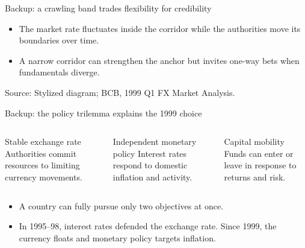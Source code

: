 \documentclass[10pt,aspectratio=169]{beamer}
\newcommand{\source}[1]{%
  \par\vfill{\tiny\color{MidGray}Source: #1}}
\begin{document}
\begin{frame}{Backup: a crawling band trades flexibility for credibility}
  \begin{center}
  \end{center}
  \begin{itemize}
    \item The market rate fluctuates inside the corridor while the authorities move its boundaries over time.
    \item A narrow corridor can strengthen the anchor but invites one-way bets when fundamentals diverge.
  \end{itemize}
  \source{Stylized diagram; BCB, 1999 Q1 FX Market Analysis.}
\end{frame}

\begin{frame}{Backup: the policy trilemma explains the 1999 choice}
  \begin{columns}[T,onlytextwidth]
      \begin{block}{Stable exchange rate}
        Authorities commit resources to limiting currency movements.
      \end{block}
      \begin{block}{Independent monetary policy}
        Interest rates respond to domestic inflation and activity.
      \end{block}
      \begin{block}{Capital mobility}
        Funds can enter or leave in response to returns and risk.
      \end{block}
  \end{columns}
  \vspace{.45cm}
  \begin{itemize}
    \item A country can fully pursue only two objectives at once.
    \item In 1995--98, interest rates defended the exchange rate. Since 1999, the currency floats and monetary policy targets inflation.
  \end{itemize}
\end{frame}
\end{document}
